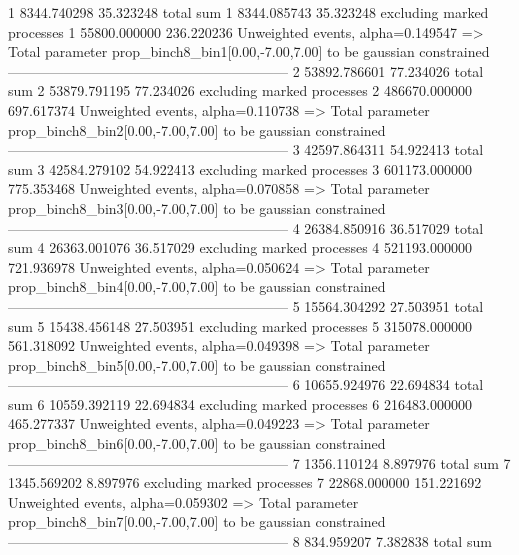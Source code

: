 1          8344.740298     35.323248       total sum                     
1          8344.085743     35.323248       excluding marked processes    
1          55800.000000    236.220236      Unweighted events, alpha=0.149547
  => Total parameter prop_binch8_bin1[0.00,-7.00,7.00] to be gaussian constrained
------------------------------------------------------------
2          53892.786601    77.234026       total sum                     
2          53879.791195    77.234026       excluding marked processes    
2          486670.000000   697.617374      Unweighted events, alpha=0.110738
  => Total parameter prop_binch8_bin2[0.00,-7.00,7.00] to be gaussian constrained
------------------------------------------------------------
3          42597.864311    54.922413       total sum                     
3          42584.279102    54.922413       excluding marked processes    
3          601173.000000   775.353468      Unweighted events, alpha=0.070858
  => Total parameter prop_binch8_bin3[0.00,-7.00,7.00] to be gaussian constrained
------------------------------------------------------------
4          26384.850916    36.517029       total sum                     
4          26363.001076    36.517029       excluding marked processes    
4          521193.000000   721.936978      Unweighted events, alpha=0.050624
  => Total parameter prop_binch8_bin4[0.00,-7.00,7.00] to be gaussian constrained
------------------------------------------------------------
5          15564.304292    27.503951       total sum                     
5          15438.456148    27.503951       excluding marked processes    
5          315078.000000   561.318092      Unweighted events, alpha=0.049398
  => Total parameter prop_binch8_bin5[0.00,-7.00,7.00] to be gaussian constrained
------------------------------------------------------------
6          10655.924976    22.694834       total sum                     
6          10559.392119    22.694834       excluding marked processes    
6          216483.000000   465.277337      Unweighted events, alpha=0.049223
  => Total parameter prop_binch8_bin6[0.00,-7.00,7.00] to be gaussian constrained
------------------------------------------------------------
7          1356.110124     8.897976        total sum                     
7          1345.569202     8.897976        excluding marked processes    
7          22868.000000    151.221692      Unweighted events, alpha=0.059302
  => Total parameter prop_binch8_bin7[0.00,-7.00,7.00] to be gaussian constrained
------------------------------------------------------------
8          834.959207      7.382838        total sum                     
